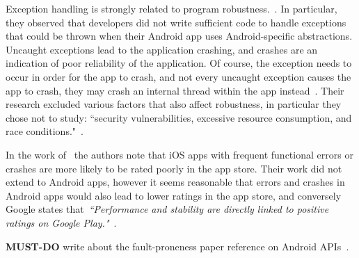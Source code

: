 Exception handling is strongly related to program robustness.~\citep{Oliveira_Borges_Silva_Cacho_Castor_2018_android_error_handling}. In particular, they observed that developers did not write sufficient code to handle exceptions that could be thrown when their Android app uses Android-specific abstractions. Uncaught exceptions lead to the application crashing, and crashes are an indication of poor reliability of the application. Of course, the exception needs to occur in order for the app to crash, and not every uncaught exception causes the app to crash, they may crash an internal thread within the app instead~\citep{Oliveira_Borges_Silva_Cacho_Castor_2018_android_error_handling}. %
Their research excluded various factors that also affect robustness, in particular they chose not to study: ``security vulnerabilities, excessive resource consumption, and race conditions."~\citep{Oliveira_Borges_Silva_Cacho_Castor_2018_android_error_handling}. %

In the work of~\citep{khalid2015_what_do_mobile_app_users_complain_about} the authors note that iOS apps with frequent functional errors or crashes are more likely to be rated poorly in the app store. Their work did not extend to Android apps, however it seems reasonable that errors and crashes in Android apps would also lead to lower ratings in the app store, and conversely Google states that~\emph{``Performance and stability are directly linked to positive ratings on Google Play."}~\citep{android_vitals_best_practices}.

\textbf{MUST-DO} write about the fault-proneness paper reference on Android APIs~\citep{linares2013_api_change_and_fault_proneness_android}.

